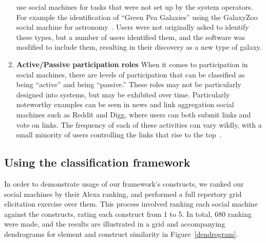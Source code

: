 \documentclass{sig-alternate}
\begin{document}
\begin{enumerate}
    use social machines for tasks that were not set up by the system operators. For example
    the identification of ``Green Pea Galaxies'' using the GalaxyZoo social machine for
    astronomy~\cite{greenpea}. Users were not originally asked to identify these types, but
    a number of users identified them, and the software was modified to include them,
    resulting in their discovery as a new type of galaxy.
\item {\bf Active/Passive participation roles}
    \newline When it comes to participation in social machines, there are levels of
    participation that can be classified as being ``active'' and being ``passive.'' These
    roles may not be particularly designed into systems, but may be exhibited over time.
    Particularly noteworthy examples can be seen in news and link aggregation social
    machines such as Reddit and Digg, where users can both submit links and vote on links.
    The frequency of each of these activities can vary wildly, with a small
    minority of users controlling the links that rise to the top~\cite{digg}.
\end{enumerate}

\subsection{Using the classification framework}

In order to demonstrate usage of our framework's constructs, we ranked our social machines
by their Alexa ranking, and performed a full repertory grid elicitation exercise over them.
This process involved ranking each social machine against the constructs, rating each construct
from 1 to 5. In total, 680 ranking were made, and the
results are illustrated in a grid and accompanying dendrograms for element and construct
similarity in Figure~\ref{dendrogram}.
\end{document}
